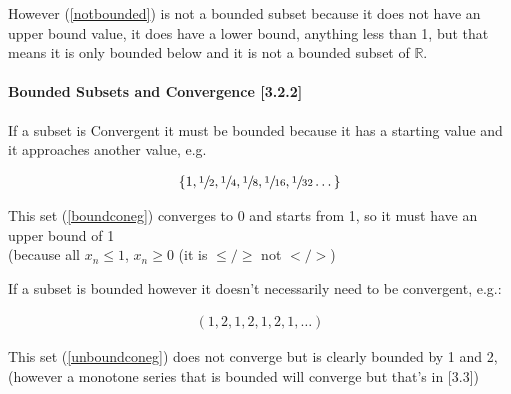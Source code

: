 \documentclass[class=article, crop=false]{standalone}
\begin{document}
However (\ref{notbounded}) is not a bounded subset because it does not have an upper bound value, it does have a lower bound, anything less than 1, but that means it is only bounded below and it is not a bounded subset of $\mathbb{R}$.

\paragraph{Bounded Subsets and Convergence [3.2.2]} If a subset is Convergent it must be bounded because it has a starting value and it approaches another value, e.g.

\begin{align}
  \left\{ 1, \sfrac{1}{2}, \sfrac{1}{4}, \sfrac{1}{8}, \sfrac{1}{16}, \sfrac{1}{32} \dots  \right\}  
  \label{boundconeg}
\end{align}

This set (\ref{boundconeg}) converges to 0 and starts from 1, so it must have an upper bound of 1\\ (because all $x_{n} \leq 1$, $x_n \geq 0$ (\small it is $\leq/\geq$ not $</>$)

  If a subset is bounded however it doesn't necessarily need to be convergent, e.g.:

  \begin{align}
    \left( 1,2,1,2,1,2,1, \dots \right)
    \label{unboundconeg}
  \end{align}

  This set (\ref{unboundconeg}) does not converge but is clearly bounded by 1 and 2, {\footnotesize \\
    (however a monotone series that is bounded will converge but that's in [3.3])
}


\end{document}
